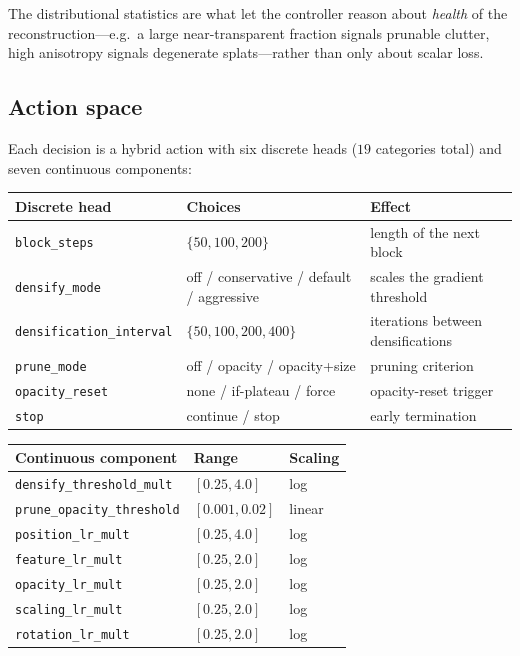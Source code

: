 \documentclass[11pt]{article}
\begin{document}
The distributional statistics are what let the controller reason about
\emph{health} of the reconstruction---e.g.\ a large near-transparent fraction
signals prunable clutter, high anisotropy signals degenerate splats---rather than
only about scalar loss.

\subsection{Action space}
\label{sec:action}

Each decision is a hybrid action with six discrete heads ($19$ categories total)
and seven continuous components:

\begin{center}
\begin{tabular}{@{}lll@{}}
\toprule
\textbf{Discrete head} & \textbf{Choices} & \textbf{Effect} \\
\midrule
\texttt{block\_steps}            & $\{50,100,200\}$                                  & length of the next block \\
\texttt{densify\_mode}           & off / conservative / default / aggressive          & scales the gradient threshold \\
\texttt{densification\_interval} & $\{50,100,200,400\}$                              & iterations between densifications \\
\texttt{prune\_mode}             & off / opacity / opacity+size                       & pruning criterion \\
\texttt{opacity\_reset}          & none / if-plateau / force                          & opacity-reset trigger \\
\texttt{stop}                    & continue / stop                                    & early termination \\
\bottomrule
\end{tabular}
\end{center}

\begin{center}
\begin{tabular}{@{}lll@{}}
\toprule
\textbf{Continuous component} & \textbf{Range} & \textbf{Scaling} \\
\midrule
\texttt{densify\_threshold\_mult}   & $[0.25, 4.0]$   & log \\
\texttt{prune\_opacity\_threshold}  & $[0.001, 0.02]$ & linear \\
\texttt{position\_lr\_mult}         & $[0.25, 4.0]$   & log \\
\texttt{feature\_lr\_mult}          & $[0.25, 2.0]$   & log \\
\texttt{opacity\_lr\_mult}          & $[0.25, 2.0]$   & log \\
\texttt{scaling\_lr\_mult}          & $[0.25, 2.0]$   & log \\
\texttt{rotation\_lr\_mult}         & $[0.25, 2.0]$   & log \\
\bottomrule
\end{tabular}
\end{center}
\end{document}
